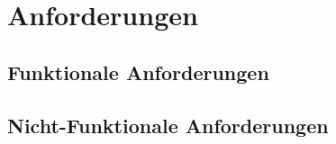 \section{Anforderungen}

\subsection{Funktionale Anforderungen}


\subsection{Nicht-Funktionale Anforderungen}